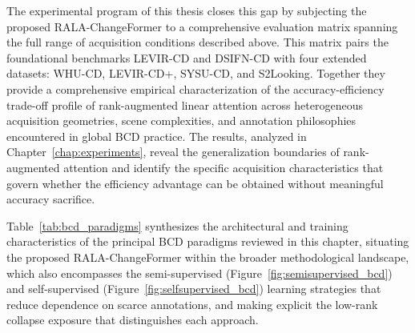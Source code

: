 The experimental program of this thesis closes this gap by subjecting the proposed RALA-ChangeFormer \cite{acuna2026efficient} to a comprehensive evaluation matrix spanning the full range of acquisition conditions described above. This matrix pairs the foundational benchmarks LEVIR-CD and DSIFN-CD with four extended datasets: WHU-CD, LEVIR-CD+, SYSU-CD, and S2Looking. Together they provide a comprehensive empirical characterization of the accuracy-efficiency trade-off profile of rank-augmented linear attention across heterogeneous acquisition geometries, scene complexities, and annotation philosophies encountered in global \ac{BCD} practice. The results, analyzed in Chapter~\ref{chap:experiments}, reveal the generalization boundaries of rank-augmented attention and identify the specific acquisition characteristics that govern whether the efficiency advantage can be obtained without meaningful accuracy sacrifice.

Table~\ref{tab:bcd_paradigms} synthesizes the architectural and training characteristics of the principal \ac{BCD} paradigms reviewed in this chapter, situating the proposed RALA-ChangeFormer within the broader methodological landscape, which also encompasses the semi-supervised (Figure~\ref{fig:semisupervised_bcd}) and self-supervised (Figure~\ref{fig:selfsupervised_bcd}) learning strategies that reduce dependence on scarce annotations, and making explicit the low-rank collapse exposure that distinguishes each approach.

